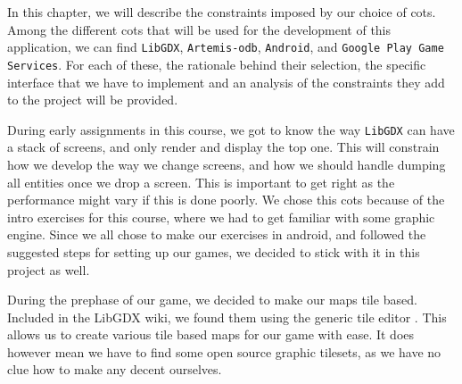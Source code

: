 
In this chapter, we will describe the constraints imposed by our choice of \gls{cots}. Among the different \gls{cots} that will be used for the development of this application, we can find \texttt{LibGDX}, \texttt{Artemis-odb}, \texttt{Android}, and \texttt{Google Play Game Services}. For each of these, the rationale behind their selection, the specific interface that we have to implement and an analysis of the constraints they add to the project will be provided.




During early assignments in this course, we got to know the way \texttt{LibGDX} \citep{libgdx} can have a stack of screens, and only render and display the top one. This will constrain how we develop the way we change screens, and how we should handle dumping all entities once we drop a screen. This is important to get right as the performance might vary if this is done poorly.
We chose this \gls{cots} because of the intro exercises for this course, where we had to get familiar with some graphic engine. Since we all chose to make our exercises in android, and followed the suggested steps for setting up our games, we decided to stick with it in this project as well.

During the prephase of our game, we decided to make our maps tile based. Included in the LibGDX wiki, we found them using the generic tile editor \citep{tiled}. This allows us to create various tile based maps for our game with ease. It does however mean we have to find some open source graphic tilesets, as we have no clue how to make any decent ourselves.

